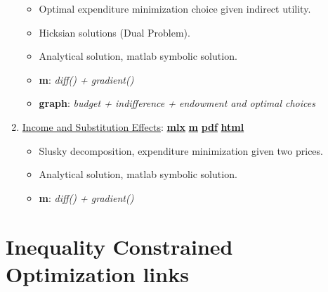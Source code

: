 \documentclass[
]{book}
\providecommand{\tightlist}{%
  \setlength{\itemsep}{0pt}\setlength{\parskip}{0pt}}
\begin{document}
\begin{enumerate}
  \begin{itemize}
  \tightlist
  \item
    Optimal expenditure minimization choice given indirect utility.
  \item
    Hicksian solutions (Dual Problem).
  \item
    Analytical solution, matlab symbolic solution.
  \item
    \textbf{m}: \emph{diff() + gradient()}
  \item
    \textbf{graph}: \emph{budget + indifference + endowment and optimal choices}
  \end{itemize}
\item
  \href{https://fanwangecon.github.io/Math4Econ/opti_hh_constrained_brsv/htmlpdfm/household_c1_c2_constrained_r_change.html}{Income and Substitution Effects}: \href{https://github.com/FanWangEcon/Math4Econ/blob/master/opti_hh_constrained_brsv/household_c1_c2_constrained_r_change.mlx}{\textbf{mlx}} \textbar{} \href{https://github.com/FanWangEcon/Math4Econ/blob/master/opti_hh_constrained_brsv/htmlpdfm/household_c1_c2_constrained_r_change.m}{\textbf{m}} \textbar{} \href{https://github.com/FanWangEcon/Math4Econ/blob/master/opti_hh_constrained_brsv/htmlpdfm/household_c1_c2_constrained_r_change.pdf}{\textbf{pdf}} \textbar{} \href{https://fanwangecon.github.io/Math4Econ/opti_hh_constrained_brsv/htmlpdfm/household_c1_c2_constrained_r_change.html}{\textbf{html}}

  \begin{itemize}
  \tightlist
  \item
    Slusky decomposition, expenditure minimization given two prices.
  \item
    Analytical solution, matlab symbolic solution.
  \item
    \textbf{m}: \emph{diff() + gradient()}
  \end{itemize}
\end{enumerate}

\hypertarget{inequality-constrained-optimization-links}{%
\section{Inequality Constrained Optimization links}\label{inequality-constrained-optimization-links}}
\end{document}
